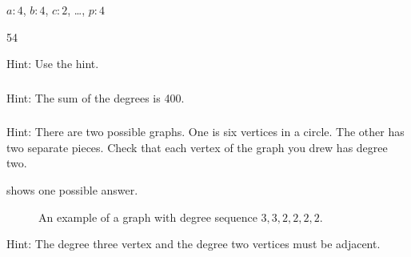 \subsubsection*{ \answers}
\begin{apart}
    \item $a:4$, $b:4$, $c:2$, \ldots, $p:4$
    \item 54
    \item Hint: Use the hint.
\end{apart}

\subsubsection*{ \answers}
    Hint: The sum of the degrees is 400.

\subsubsection*{ \answers}
    \begin{apart}
        \item Hint: There are two possible graphs.  One is six vertices in a circle. The other has two separate pieces.  Check that each vertex of the graph you drew has degree two.
        \item {} shows one possible answer.

        \begin{figure}[hbtp]
            \centering
            
            \caption{An example of a graph with degree sequence $3,3,2,2,2,2$.}
            \label{fig_graphical_answer}
        \end{figure}

        \item Hint: The degree three vertex and the degree two vertices must be adjacent.
    \end{apart}

